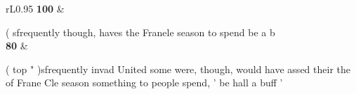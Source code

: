 {\begin{tabular}{rL{0.95\linewidth}}
\textbf{100} &\strut{}\smallmasktok{}\smallmasktok{}(\smallmasktok{}\smallmasktok{}\smallmasktok{} \smallmasktok{}\smallmasktok{}\smallmasktok{}\smallmasktok{}\smallmasktok{}s\smallmasktok{}frequently\smallmasktok{}\smallmasktok{}\smallmasktok{}\smallmasktok{}\smallmasktok{}\smallmasktok{}\smallmasktok{}\smallmasktok{}\smallmasktok{}\smallmasktok{}\smallmasktok{}\smallmasktok{}\smallmasktok{}\smallmasktok{}\smallmasktok{}\smallmasktok{}\smallmasktok{}\smallmasktok{} though\smallmasktok{}\smallmasktok{}\smallmasktok{},\smallmasktok{} have\smallmasktok{}s\smallmasktok{}\smallmasktok{}\smallmasktok{}\smallmasktok{}\smallmasktok{}\smallmasktok{}\smallmasktok{}\smallmasktok{}\smallmasktok{} the\smallmasktok{}\smallmasktok{}\smallmasktok{} Fran\smallmasktok{}\smallmasktok{}\smallmasktok{}e\smallmasktok{}\smallmasktok{}\smallmasktok{}\smallmasktok{}\smallmasktok{}\smallmasktok{}\smallmasktok{}le\smallmasktok{}\smallmasktok{}\smallmasktok{}\smallmasktok{}\smallmasktok{}\smallmasktok{}\smallmasktok{}\smallmasktok{}\smallmasktok{}\smallmasktok{} season\smallmasktok{}\smallmasktok{}\smallmasktok{}\smallmasktok{}\smallmasktok{} \smallmasktok{} to\smallmasktok{}\smallmasktok{} spend\smallmasktok{}\smallmasktok{}\smallmasktok{}\smallmasktok{}\smallmasktok{}\smallmasktok{}\smallmasktok{}\smallmasktok{}\smallmasktok{}\smallmasktok{}\smallmasktok{}\smallmasktok{}\smallmasktok{}\smallmasktok{}\smallmasktok{} be\smallmasktok{}\smallmasktok{}\smallmasktok{}\smallmasktok{}\smallmasktok{}\smallmasktok{}\smallmasktok{}\smallmasktok{}\smallmasktok{}\smallmasktok{} a b\smallmasktok{}\smallmasktok{}\smallmasktok{}\smallmasktok{}\smallmasktok{}\smallmasktok{}\smallmasktok{}\smallmasktok{}\smallmasktok{}\\
\textbf{80} &\strut{}\smallmasktok{}\smallmasktok{}(\smallmasktok{}\smallmasktok{} top " )\smallmasktok{}\smallmasktok{}s\smallmasktok{}frequently invad\smallmasktok{}\smallmasktok{} United\smallmasktok{}\smallmasktok{}\smallmasktok{} some were\smallmasktok{}\smallmasktok{}\smallmasktok{}\smallmasktok{}\smallmasktok{}\smallmasktok{}\smallmasktok{}\smallmasktok{}, though\smallmasktok{}\smallmasktok{}\smallmasktok{}, would have ass\smallmasktok{}ed their\smallmasktok{}\smallmasktok{}\smallmasktok{}\smallmasktok{}\smallmasktok{}\smallmasktok{} the\smallmasktok{}\smallmasktok{} of Fran\smallmasktok{}\smallmasktok{}\smallmasktok{}e\smallmasktok{}\smallmasktok{}\smallmasktok{}\smallmasktok{} C\smallmasktok{}\smallmasktok{}le\smallmasktok{}\smallmasktok{}\smallmasktok{}\smallmasktok{}\smallmasktok{}\smallmasktok{}\smallmasktok{}\smallmasktok{}\smallmasktok{}\smallmasktok{} season\smallmasktok{}\smallmasktok{}\smallmasktok{}\smallmasktok{}\smallmasktok{} something to\smallmasktok{} people spend\smallmasktok{}\smallmasktok{},\smallmasktok{}\smallmasktok{}\smallmasktok{}\smallmasktok{}\smallmasktok{}\smallmasktok{} '\smallmasktok{}\smallmasktok{}\smallmasktok{}\smallmasktok{}\smallmasktok{} be\smallmasktok{}\smallmasktok{}\smallmasktok{}\smallmasktok{}\smallmasktok{} hall\smallmasktok{}\smallmasktok{}\smallmasktok{}\smallmasktok{} a buff\smallmasktok{}\smallmasktok{}\smallmasktok{}\smallmasktok{}\smallmasktok{} '\smallmasktok{}\smallmasktok{}\\

\end{tabular}}
